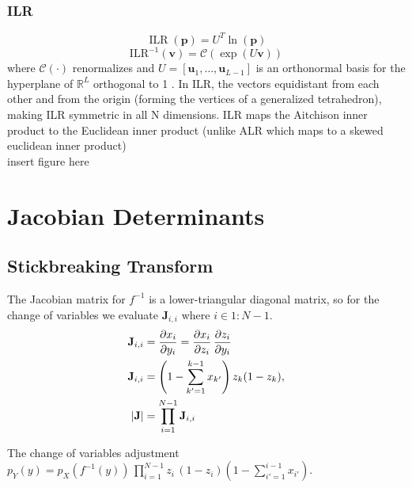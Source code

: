 \begin{appendices}
\subsubsection{ILR}
$$
\operatorname{ILR}(\mathbf{p})=U^T \ln (\mathbf{p})
$$
$$
\mathrm{ILR}^{-1}(\mathbf{v})=\mathcal{C}(\exp (U \mathbf{v}))
$$
where $\mathcal{C}(\cdot)$ renormalizes and $U=\left[\mathbf{u}_1, \ldots, \mathbf{u}_{L-1}\right]$ is an orthonormal basis for the hyperplane of $\mathbb{R}^L$ orthogonal to 1 . In ILR, the vectors equidistant from each other and from the origin (forming the vertices of a generalized tetrahedron), making ILR symmetric in all N dimensions. ILR maps the Aitchison inner product to the Euclidean inner product (unlike ALR which maps to a skewed euclidean inner product)
\\

{{insert figure here}}


\section{Jacobian Determinants}
\subsection{Stickbreaking Transform}
The Jacobian matrix for $f^{-1}$ is a lower-triangular diagonal matrix, so for the change of variables we evaluate $\mathbf{J}_{i, i}$ where $i \in 1:N-1$.
\begin{align*}
\mathbf{J}_{i, i} &= \frac{\partial x_i}{\partial y_i}
=
\frac{\partial x_i}{\partial z_i} \,
\frac{\partial z_i}{\partial y_i}\\
\mathbf{J}_{i, i} &= \left(
  1 - \sum_{k' = 1}^{k-1} x_{k'}
   \right) z_k (1 - z_k),\\
   \left| \textbf{J} \right| &= \prod_{i=1}^{N-1} \textbf{J}_{i,i}
\end{align*}

The change of variables adjustment $p_Y(y) = p_X(f^{-1}(y))\,
\prod_{i=1}^{N-1}z_i\,(1 - z_i)\left(1 - \sum_{i'=1}^{i-1} x_{i'}\right).$


\end{appendices}
